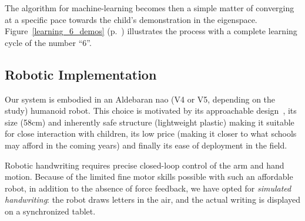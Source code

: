 \documentclass{article}
\begin{document}
The algorithm for machine-learning becomes then a simple matter of converging at
a specific pace towards the child's demonstration in the eigenspace.
Figure~\ref{learning_6_demos} (p.~\pageref{learning_6_demos}) illustrates the
process with a complete learning cycle of the number ``6''.

\subsection{Robotic Implementation}

Our system is embodied in an Aldebaran {\sc nao} (V4 or V5, depending on the
study) humanoid robot. This choice is motivated by its approachable
design~\cite{Gouaillier2008}, its size (58cm) and inherently safe structure
(lightweight plastic) making it suitable for close interaction with children,
its low price (making it closer to what schools may afford in the coming years)
and finally its ease of deployment in the field.

Robotic handwriting requires precise closed-loop control of the arm and hand
motion. Because of the limited fine motor skills possible with such an
affordable robot, in addition to the absence of force feedback, we have opted
for \emph{simulated handwriting}: the robot draws letters in the air, and the
actual writing is displayed on a synchronized tablet.
\end{document}
